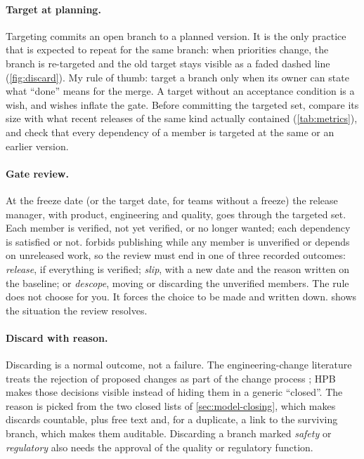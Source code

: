 \paragraph{Target at planning.}
Targeting commits an open branch to a planned version. It is the only
practice that is expected to repeat for the same branch: when priorities
change, the branch is re-targeted and the old target stays visible as a
faded dashed line (\cref{fig:discard}). My rule of thumb: target a branch
only when its owner can state what ``done'' means for the merge. A target
without an acceptance condition is a wish, and wishes inflate the gate.
Before committing the targeted set, compare its size with what recent
releases of the same kind actually contained (\cref{tab:metrics}), and check
that every dependency of a member is targeted at the same or an earlier
version.

\paragraph{Gate review.}
At the freeze date (or the target date, for teams without a freeze) the
release manager, with product, engineering and quality, goes through the
targeted set. Each member is verified, not yet verified, or no longer
wanted; each dependency is satisfied or not.  forbids
publishing while any member is unverified or depends on unreleased work,
so the review must end in one of three recorded outcomes:
\emph{release}, if everything is verified; \emph{slip}, with a new date
and the reason written on the baseline; or \emph{descope}, moving or
discarding the unverified members. The rule does not choose for you. It
forces the choice to be made and written down. 
shows the situation the review resolves.

\paragraph{Discard with reason.}
Discarding is a normal outcome, not a failure. The engineering-change
literature treats the rejection of proposed changes as part of the change
process \citep{jarratt2011ec}; HPB makes those decisions visible instead of
hiding them in a generic ``closed''. The reason is picked from the two
closed lists of \cref{sec:model-closing}, which makes discards countable,
plus free text and, for a duplicate, a link to the surviving branch, which
makes them auditable. Discarding a branch marked \emph{safety} or
\emph{regulatory} also needs the approval of the quality or regulatory
function.

